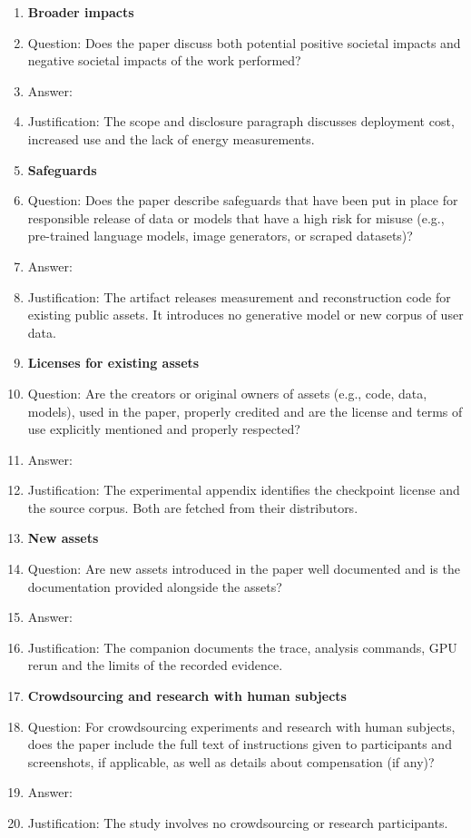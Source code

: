 \begin{enumerate}
\item {\bf Broader impacts}
    \item[] Question: Does the paper discuss both potential positive societal impacts and negative societal impacts of the work performed?
    \item[] Answer: \answerYes{}
    \item[] Justification: The scope and disclosure paragraph discusses deployment cost, increased use and the lack of energy measurements.

    
\item {\bf Safeguards}
    \item[] Question: Does the paper describe safeguards that have been put in place for responsible release of data or models that have a high risk for misuse (e.g., pre-trained language models, image generators, or scraped datasets)?
    \item[] Answer: \answerNA{}
    \item[] Justification: The artifact releases measurement and reconstruction code for existing public assets. It introduces no generative model or new corpus of user data.


\item {\bf Licenses for existing assets}
    \item[] Question: Are the creators or original owners of assets (e.g., code, data, models), used in the paper, properly credited and are the license and terms of use explicitly mentioned and properly respected?
    \item[] Answer: \answerYes{}
    \item[] Justification: The experimental appendix identifies the checkpoint license and the source corpus. Both are fetched from their distributors.


\item {\bf New assets}
    \item[] Question: Are new assets introduced in the paper well documented and is the documentation provided alongside the assets?
    \item[] Answer: \answerYes{}
    \item[] Justification: The companion documents the trace, analysis commands, GPU rerun and the limits of the recorded evidence.


\item {\bf Crowdsourcing and research with human subjects}
    \item[] Question: For crowdsourcing experiments and research with human subjects, does the paper include the full text of instructions given to participants and screenshots, if applicable, as well as details about compensation (if any)? 
    \item[] Answer: \answerNA{}
    \item[] Justification: The study involves no crowdsourcing or research participants.



\end{enumerate}
